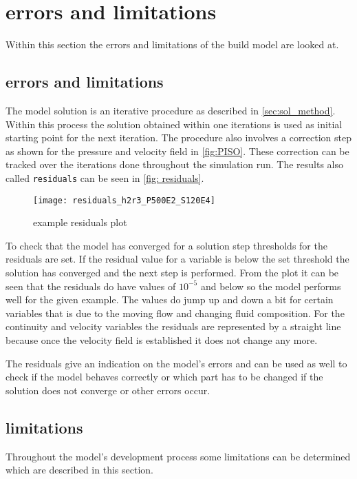 \documentclass[../thesis.tex]{subfiles}
\begin{document}
\chapter{errors and limitations}
\label{chp:err_lims}

Within this section the errors and limitations of the build model are looked at.

\section{errors and limitations}

The model solution is an iterative procedure as described in \autoref{sec:sol_method}. Within this process the solution obtained within one iterations is used as initial starting point for the next iteration. The procedure also involves a correction step as shown for the pressure and velocity field in \autoref{fig:PISO}. These correction can be tracked over the iterations done throughout the simulation run. The results also called \texttt{residuals} can be seen in \autoref{fig: residuals}.
\begin{figure}[htbp]
	\centering
	\texttt{[image: residuals\_h2r3\_P500E2\_S120E4]}
	\caption{example residuals plot}
	\label{fig: residuals}
\end{figure}
To check that the model has converged for a solution step thresholds for the residuals are set. If the residual value for a variable is below the set threshold the solution has converged and the next step is performed. From the plot it can be seen that the residuals do have values of $10^{-5}$ and below so the model performs well for the given example. The values do jump up and down a bit for certain variables that is due to the moving flow and changing fluid composition. For the continuity and velocity variables the residuals are represented by a straight line because once the velocity field is established it does not change any more.

The residuals give an indication on the model's errors and can be used as well to check if the model behaves correctly or which part has to be changed if the solution does not converge or other errors occur.

\section{limitations}
Throughout the model's development process some limitations can be determined which are described in this section.
\end{document}
